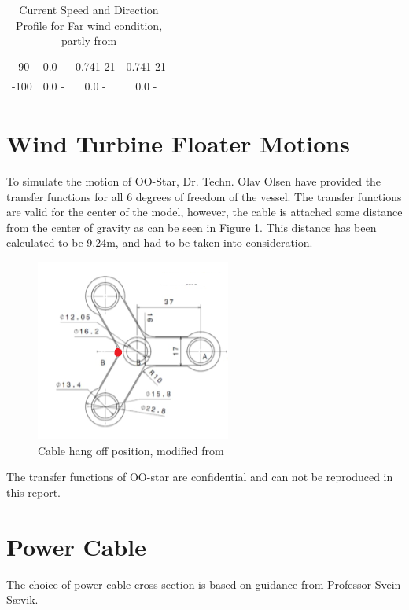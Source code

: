 \begin{table} [H]
\begin{tabular}{ |c|c|c|c|}
 -90 & 0.0 \hspace{0.7cm} - & 0.741 \hspace{0.7cm} 21  & 0.741 \hspace{1.15cm} 21 \\ 
 -100 & 0.0 \hspace{0.7cm} - & 0.0 \hspace{0.7cm} -  & 0.0 \hspace{1.15cm} - \\ 
 \hline
\end{tabular}
\caption{Current Speed and Direction Profile for Far wind condition, partly from \cite{Lifes50+D1.1}}
\label{table:tidcur}
\end{table}   

\section{Wind Turbine Floater Motions}
To simulate the motion of OO-Star, Dr. Techn. Olav Olsen have provided the transfer functions for all 6 degrees of freedom of the vessel. The transfer functions are valid for the center of the model, however, the cable is attached some distance from the center of gravity as can be seen in Figure \ref{fig:cabhang}. This distance has been calculated to be 9.24m, and had to be taken into consideration. 

\begin{figure}[H]
\centering
\includegraphics[scale=1.2]{figures/cabhang}
\caption[$\; \:$Cable hang off position]{Cable hang off position, modified from \cite{Lifes50+D4.2}}
 \label{fig:cabhang}
\end{figure}
 \noindent The transfer functions of OO-star are confidential and can not be reproduced in this report. 
 
\section{Power Cable}
The choice of power cable cross section is based on guidance from Professor Svein Sævik. 

